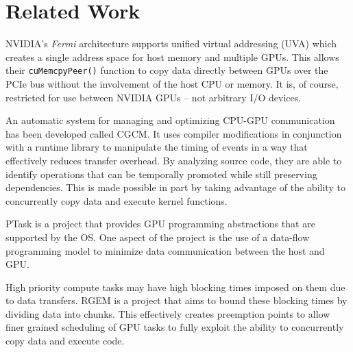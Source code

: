 \section{Related Work}
\label{sec:related_work}

NVIDIA's \emph{Fermi} architecture\cite{Fermi} supports unified virtual addressing (UVA) which creates a single address space for host memory and multiple GPUs. This allows their {\tt cuMemcpyPeer()} function to copy data directly between GPUs over the PCIe bus without the involvement of the host CPU or memory. It is, of course, restricted for use between NVIDIA GPUs -- not arbitrary I/O devices.

An automatic system for managing and optimizing CPU-GPU communication has been developed called CGCM\cite{Jablin:2011:ACC:1993316.1993516}. It uses compiler modifications in conjunction with a runtime library to manipulate the timing of events in a way that effectively reduces transfer overhead. By analyzing source code, they are able to identify operations that can be temporally promoted while still preserving dependencies. This is made possible in part by taking advantage of the ability to concurrently copy data and execute kernel functions.

PTask\cite{Rossbach_SOSP11} is a project that provides GPU programming abstractions that are supported by the OS. One aspect of the project is the use
of a data-flow programming model to minimize data communication between the host and GPU.

High priority compute tasks may have high blocking times imposed on them due to data transfers. RGEM\cite{Kato_RTSS11} is a project that aims to bound these blocking times by dividing data into chunks. This effectively creates preemption points to allow finer grained scheduling of GPU tasks to fully exploit the ability to concurrently copy data and execute code.
